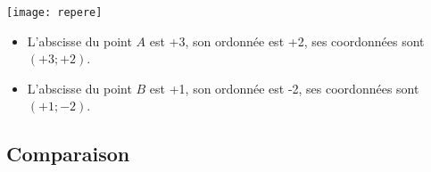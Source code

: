 \begin{myexs}
	
		\begin{center}
			\texttt{[image: repere]}
		\end{center}
	

	\begin{itemize}
		\item L'abscisse du point $A$ est +3, son ordonnée est +2, ses coordonnées sont $(+3; +2)$.
		
		\item L'abscisse du point $B$ est +1, son ordonnée est -2, ses coordonnées sont $(+1; -2)$.
	\end{itemize}

\end{myexs}


\subsection{Comparaison}